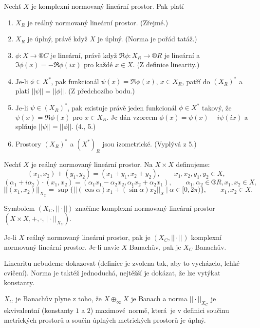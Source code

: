 \documentclass[12pt]{article}					%
\begin{document}
\begin{veta}
	Nechť $X$ je komplexní normovaný lineární prostor. Pak platí\vspace{-1em}
	
	\begin{enumerate}
		\item $X_R$ je reálný normovaný lineární prostor. (Zřejmé.)
		\item $X_R$ je úplný, právě když $X$ je úplný. (Norma je pořád tatáž.)
		\item $\phi: X \rightarrow ®C$ je lineární, právě když $\Re \phi: X_R \rightarrow ®R$ je lineární a $\Im \phi(x) = -\Re \phi(ix)$ pro každé $x \in X$. (Z definice linearity.)
		\item Je-li $\phi \in X^*$, pak funkcionál $\psi(x) = \Re \phi(x)$, $x \in X_R$, patří do $(X_R)^*$ a platí $||\psi|| = ||\phi||$. (Z předchozího bodu.)
		\item Je-li $\psi \in (X_R)^*$, pak existuje právě jeden funkcionál $\phi \in X^*$ takový, že $\psi(x) = \Re \phi(x)$ pro $x \in X_R$. Je dán vzorcem $\phi(x) = \psi(x) - i\psi(ix)$ a splňuje $||\psi|| = ||\phi||$. (4., 5.)
		\item Prostory $(X_R)^*$ a $(X^*)_R$ jsou izometrické.  (Vyplývá z 5.)
	\end{enumerate}
\end{veta}

\begin{definice}
	Nechť $X$ je reálný normovaný lineární prostor. Na $X \times X$ definujeme:
	$$ (x_1, x_2) + (y_1, y_2) = (x_1 + y_1, x_2 + y_2), \qquad x_1, x_2, y_1, y_2 \in X, $$
	$$ (\alpha_1 + i\alpha_2)·(x_1, x_2) = (\alpha_1x_1 - \alpha_2x_2, \alpha_1x_2 + \alpha_2 x_1), \qquad \alpha_1, \alpha_2 \in ®R, x_1, x_2 \in X, $$
	$$ ||(x_1, x_2)||_{X_C} = \sup\{||(\cos \alpha)x_1 + (\sin \alpha)x_2||_X\ |\ \alpha \in [0, 2\pi)\}, \qquad x_1, x_2 \in X. $$

	Symbolem $(X_C, ||·||)$ značíme komplexní normovaný lineární prostor $(X \times X, +, ·, ||·||_{X_C})$.
\end{definice}

\begin{veta}[Komplexifikace]
	Je-li $X$ reálný normovaný lineární prostor, pak je $(X_C, ||·||)$ komplexní normovaný lineární prostor. Je-li navíc $X$ Banachův, pak je $X_C$ Banachův.

	\begin{dukazin}
		Linearitu nebudeme dokazovat (definice je zvolena tak, aby to vycházelo, lehké cvičení). Norma je taktéž jednoduchá, nejtěžší je dokázat, že lze vytýkat konstanty.

		$X_C$ je Banachův plyne z toho, že $X \oplus_∞ X$ je Banach a norma $||·||_{X_C}$ je ekvivalentní (konstanty $1$ a $2$) maximové normě, která je v definici součinu metrických prostorů a součin úplných metrických prostorů je úplný.
	\end{dukazin}
\end{veta}
\end{document}
